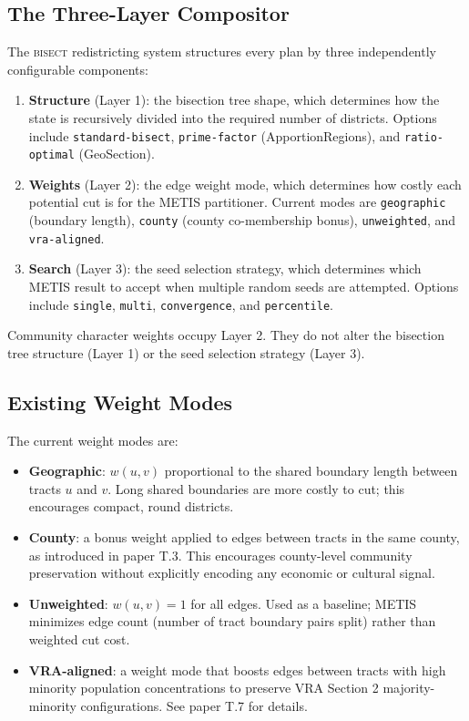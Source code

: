\label{sec:bisect-integration}

\subsection{The Three-Layer Compositor}

The \textsc{bisect} redistricting system structures every plan by three independently
configurable components:
\begin{enumerate}
  \item \textbf{Structure} (Layer 1): the bisection tree shape, which determines
    how the state is recursively divided into the required number of districts.
    Options include \texttt{standard-bisect}, \texttt{prime-factor} (ApportionRegions),
    and \texttt{ratio-optimal} (GeoSection).
  \item \textbf{Weights} (Layer 2): the edge weight mode, which determines how
    costly each potential cut is for the METIS partitioner.
    Current modes are \texttt{geographic} (boundary length), \texttt{county}
    (county co-membership bonus), \texttt{unweighted}, and \texttt{vra-aligned}.
  \item \textbf{Search} (Layer 3): the seed selection strategy, which determines
    which METIS result to accept when multiple random seeds are attempted.
    Options include \texttt{single}, \texttt{multi}, \texttt{convergence},
    and \texttt{percentile}.
\end{enumerate}
Community character weights occupy Layer 2.
They do not alter the bisection tree structure (Layer 1) or the seed selection
strategy (Layer 3).

\subsection{Existing Weight Modes}

The current weight modes are:
\begin{itemize}
  \item \textbf{Geographic}: $w(u,v)$ proportional to the shared boundary length
    between tracts $u$ and $v$.
    Long shared boundaries are more costly to cut; this encourages compact, round
    districts.
  \item \textbf{County}: a bonus weight applied to edges between tracts in the same
    county, as introduced in paper T.3.
    This encourages county-level community preservation without explicitly encoding
    any economic or cultural signal.
  \item \textbf{Unweighted}: $w(u,v) = 1$ for all edges.
    Used as a baseline; METIS minimizes edge count (number of tract boundary pairs
    split) rather than weighted cut cost.
  \item \textbf{VRA-aligned}: a weight mode that boosts edges between tracts with
    high minority population concentrations to preserve VRA Section 2 majority-minority
    configurations.
    See paper T.7 for details.
\end{itemize}

